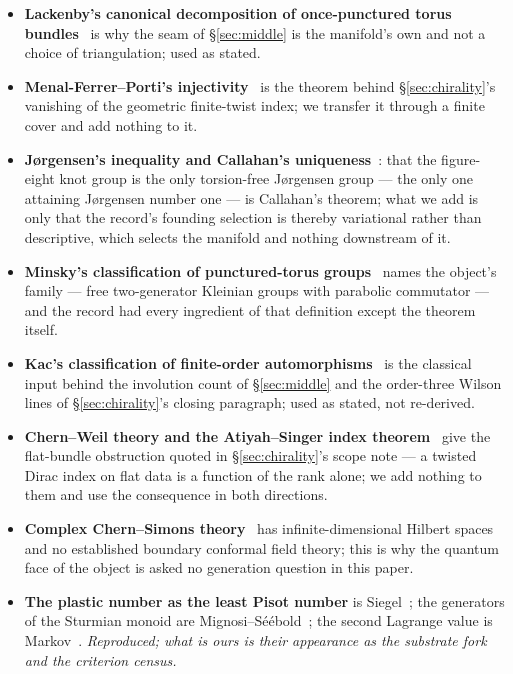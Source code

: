 \documentclass[11pt,a4paper]{article}
\theoremstyle{definition}
\theoremstyle{remark}
\begin{document}
\begin{itemize}[leftmargin=1.4em,itemsep=2pt]
fully amphichiral and the Whitehead link complement is chiral is classical. \emph{What \S\ref{sec:chirality} adds is the
counts on this object's closings and covers, the tower law, and the coexistence of the arithmetic with a remembered bit
on the covers.}
\item \textbf{Lackenby's canonical decomposition of once-punctured torus bundles}~\cite{lackenby} is why the seam of \S\ref{sec:middle} is the manifold's own and not a choice of triangulation; used as stated.
\item \textbf{Menal-Ferrer--Porti's injectivity}~\cite{mfp} is the theorem behind \S\ref{sec:chirality}'s vanishing of the geometric finite-twist index; we transfer it through a finite cover and add nothing to it.
\item \textbf{Jørgensen's inequality and Callahan's uniqueness}~\cite{jorgensen,callahan}: that the figure-eight knot group is the only torsion-free Jørgensen group --- the only one attaining Jørgensen number one --- is Callahan's theorem; what we add is only that the record's founding selection is thereby variational rather than descriptive, which selects the manifold and nothing downstream of it.
\item \textbf{Minsky's classification of punctured-torus groups}~\cite{minsky} names the object's family --- free two-generator Kleinian groups with parabolic commutator --- and the record had every ingredient of that definition except the theorem itself.
\item \textbf{Kac's classification of finite-order automorphisms}~\cite{kac} is the classical input behind the involution count of \S\ref{sec:middle} and the order-three Wilson lines of \S\ref{sec:chirality}'s closing paragraph; used as stated, not re-derived.
\item \textbf{Chern--Weil theory and the Atiyah--Singer index theorem}~\cite{atiyahsinger} give the flat-bundle obstruction quoted in \S\ref{sec:chirality}'s scope note --- a twisted Dirac index on flat data is a function of the rank alone; we add nothing to them and use the consequence in both directions.
\item \textbf{Complex Chern--Simons theory}~\cite{witten91} has infinite-dimensional Hilbert spaces and no established boundary conformal field theory; this is why the quantum face of the object is asked no generation question in this paper.
\item \textbf{The plastic number as the least Pisot number} is Siegel~\cite{siegel}; the generators of the Sturmian
monoid are Mignosi--S\'e\'ebold~\cite{ms,lothaire}; the second Lagrange value is Markov~\cite{markov}. \emph{Reproduced;
what is ours is their appearance as the substrate fork and the criterion census.}
\end{itemize}
\end{document}
